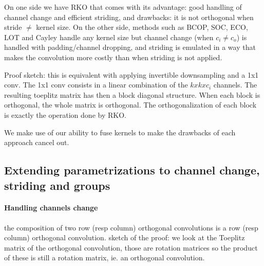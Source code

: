     On one side we have RKO that comes with its advantage: good handling of channel change and efficient striding, and drawbacks: it is not orthogonal when stride $\neq$ kernel size. On the other side, methods such as BCOP, SOC, ECO, LOT and Cayley handle any kernel size but channel change (when $c_i \neq c_o$) is handled with padding/channel dropping, and striding is emulated in a way that makes the convolution more costly than when striding is not applied.

    \begin{theorem}[RKO is orthogonal when stride=kernel size]
        Proof sketch: this is equivalent with applying invertible downsampling and a 1x1 conv. The 1x1 conv consists in a linear combination of the $kxkxc_i$ channels. The resulting toeplitz matrix has then a block diagonal structure. When each block is orthogonal, the whole matrix is orthogonal. The orthogonalization of each block is exactly the operation done by RKO. 
    \end{theorem}

    We make use of our ability to fuse kernels to make the drawbacks of each approach cancel out.

    \subsection{Extending parametrizations to channel change, striding and groups}

        \paragraph{Handling channels change}
            \begin{theorem}\label{thm_comp}
            the composition of two row (resp column) orthogonal convolutions is a row (resp column)  orthogonal convolution. sketch of the proof: we look at the Toeplitz matrix of the orthogonal convolution, those are rotation matrices so the product of these is still a rotation matrix, ie. an orthogonal convolution.
            \end{theorem}

